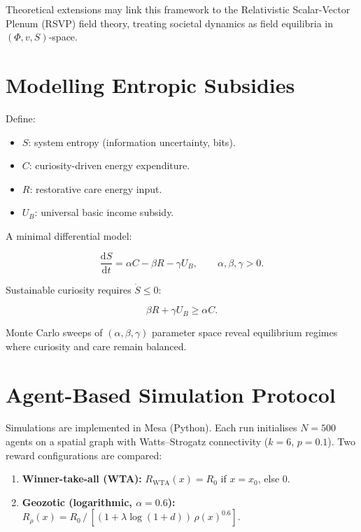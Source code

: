 \documentclass[12pt,a4paper]{article}
\theoremstyle{definition}
\newcommand{\ddt}[1]{\frac{\mathrm{d}#1}{\mathrm{d}t}}
\begin{document}
Theoretical extensions may link this framework to the Relativistic
Scalar-Vector Plenum (RSVP) field theory, treating societal dynamics as field
equilibria in $(\Phi, v, S)$-space.

\appendix

\section{Modelling Entropic Subsidies}
\label{app:entropic}

Define:
\begin{itemize}[leftmargin=*]
  \item $S$: system entropy (information uncertainty, bits).
  \item $C$: curiosity-driven energy expenditure.
  \item $R$: restorative care energy input.
  \item $U_B$: universal basic income subsidy.
\end{itemize}

A minimal differential model:

\begin{equation}
  \ddt{S} = \alpha C - \beta R - \gamma U_B,
  \qquad \alpha, \beta, \gamma > 0.
  \label{eq:subsidy_model}
\end{equation}

Sustainable curiosity requires $\dot{S} \leq 0$:

\begin{equation}
  \beta R + \gamma U_B \geq \alpha C.
\end{equation}

Monte Carlo sweeps of $(\alpha, \beta, \gamma)$ parameter space reveal
equilibrium regimes where curiosity and care remain balanced.

\section{Agent-Based Simulation Protocol}
\label{app:agentbased}

Simulations are implemented in Mesa (Python).  Each run initialises $N = 500$
agents on a spatial graph with Watts--Strogatz connectivity ($k = 6$,
$p = 0.1$).  Two reward configurations are compared:

\begin{enumerate}[leftmargin=*]
  \item \textbf{Winner-take-all (WTA):} $R_{\mathrm{WTA}}(x) = R_0$ if
    $x = x_0$, else $0$.
  \item \textbf{Geozotic (logarithmic, $\alpha = 0.6$):}
    $R_\rho(x) = R_0\,/\,[(1 + \lambda \log(1+d))\,\rho(x)^{0.6}]$.
\end{enumerate}
\end{document}
